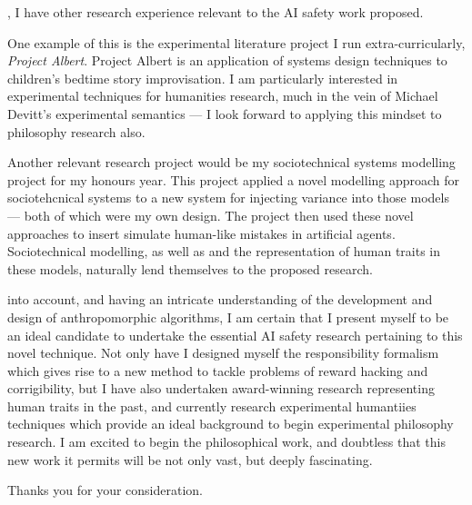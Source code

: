 , I have other research experience relevant to the AI safety work proposed.\par
One example of this is the experimental literature project I run extra-curricularly, \emph{Project Albert}. Project Albert is an application of systems design techniques to children's bedtime story improvisation. I am particularly interested in experimental techniques for humanities research, much in the vein of Michael Devitt's experimental semantics --- I look forward to applying this mindset to philosophy research also.\par
Another relevant research project would be my sociotechnical systems modelling project for my honours year. This project applied a novel modelling approach for sociotehcnical systems to a new system for injecting variance into those models --- both of which were my own design. The project then used these novel approaches to insert simulate human-like mistakes in artificial agents. Sociotechnical modelling, as well as and the representation of human traits in these models, naturally lend themselves to the proposed research.\par

 into account, and having an intricate understanding of the development and design of anthropomorphic algorithms, I am certain that I present myself to be an ideal candidate to undertake the essential AI safety research pertaining to this novel technique. Not only have I designed myself the responsibility formalism which gives rise to a new method to tackle problems of reward hacking and corrigibility, but I have also undertaken award-winning research representing human traits in the past, and currently research experimental humantiies techniques which provide an ideal background to begin experimental philosophy research. I am excited to begin the philosophical work, and doubtless that this new work it permits will be not only vast, but deeply fascinating.\par
Thanks you for your consideration.

